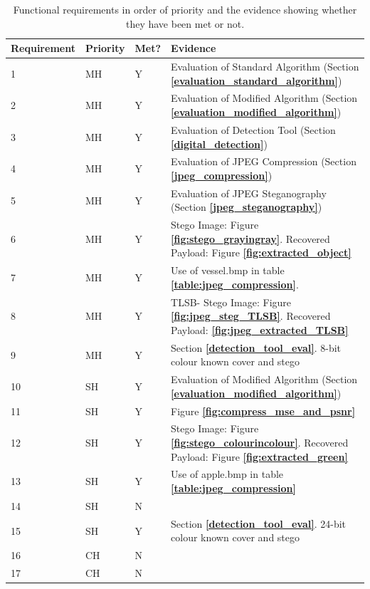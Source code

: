 \documentclass{l4proj}
\begin{document}
\begin{table}[!h]
\centering
\caption{Functional requirements in order of priority and the evidence showing whether they have been met or not.}
\label{table:meet_requirements_functional}
\begin{tabular}{@{}llll@{}}
\toprule
Requirement & Priority & Met? & Evidence                         \\ \midrule
1           & MH       & Y    & Evaluation of Standard Algorithm (Section \textbf{\ref{evaluation_standard_algorithm}}) \\
2           & MH       & Y    & Evaluation of Modified Algorithm (Section  \textbf{\ref{evaluation_modified_algorithm}})\\
3           & MH       & Y    & Evaluation of Detection Tool (Section \textbf{\ref{digital_detection}})\\
4           & MH       & Y    & Evaluation of JPEG Compression (Section \textbf{\ref{jpeg_compression}})\\
5           & MH       & Y    & Evaluation of JPEG Steganography (Section \textbf{\ref{jpeg_steganography}})\\
6           & MH       & Y    & Stego Image: Figure \textbf{\ref{fig:stego_grayingray}}. Recovered Payload: Figure \textbf{\ref{fig:extracted_object}}     \\
7           & MH       & Y    & Use of vessel.bmp in table \textbf{\ref{table:jpeg_compression}}.\\
8           & MH       & Y    & TLSB- Stego Image: Figure \textbf{\ref{fig:jpeg_steg_TLSB}}. Recovered Payload: \textbf{\ref{fig:jpeg_extracted_TLSB}}  \\
9           & MH       & Y    & Section \textbf{\ref{detection_tool_eval}}. 8-bit colour known cover and stego\\ 
10          & SH       & Y    & Evaluation of Modified Algorithm (Section  \textbf{\ref{evaluation_modified_algorithm}})\\
11          & SH       & Y    & Figure \textbf{\ref{fig:compress_mse_and_psnr}}\\
12          & SH       & Y    & Stego Image: Figure \textbf{\ref{fig:stego_colourincolour}}. Recovered Payload: Figure \textbf{\ref{fig:extracted_green}}\\ 
13          & SH       & Y    & Use of apple.bmp in table \textbf{\ref{table:jpeg_compression}}\\ 
14          & SH       & N    &                     \\ 
15          & SH       & Y    & Section \textbf{\ref{detection_tool_eval}}. 24-bit colour known cover and stego\\ 
16          & CH       & N    &                  \\ 
17          & CH       & N    &                 \\\bottomrule     
\end{tabular}
\end{table}
\end{document}
